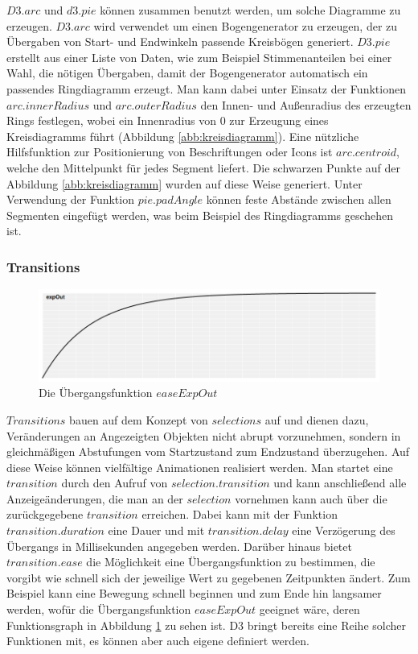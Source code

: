 $D3.arc$ und $d3.pie$ können zusammen benutzt werden, um solche Diagramme zu erzeugen. $D3.arc$ wird verwendet um einen Bogengenerator zu erzeugen, der zu Übergaben von Start- und Endwinkeln passende Kreisbögen generiert. $D3.pie$ erstellt aus einer Liste von Daten, wie zum Beispiel Stimmenanteilen bei einer Wahl, die nötigen Übergaben, damit der Bogengenerator automatisch ein passendes Ringdiagramm erzeugt. Man kann dabei unter Einsatz der Funktionen $arc.innerRadius$ und $arc.outerRadius$ den Innen- und Außenradius des erzeugten Rings festlegen, wobei ein Innenradius von 0 zur Erzeugung eines Kreisdiagramms führt (Abbildung \ref{abb:kreisdiagramm}). Eine nützliche Hilfsfunktion zur Positionierung von Beschriftungen oder Icons ist $arc.centroid$, welche den Mittelpunkt für jedes Segment liefert. Die schwarzen Punkte auf der Abbildung \ref{abb:kreisdiagramm} wurden auf diese Weise generiert. Unter Verwendung der Funktion $pie.padAngle$ können feste Abstände zwischen allen Segmenten eingefügt werden, was beim Beispiel des Ringdiagramms geschehen ist. 

\subsubsection*{Transitions}\label{sec:transitions}
\begin{figure}
	\centering
	\includegraphics[width=\linewidth]{../screenshots/expOut.png}
	\caption{Die Übergangsfunktion $easeExpOut$}
	\label{abb:easing}
\end{figure}
$Transitions$ bauen auf dem Konzept von $selections$ auf und dienen dazu, Veränderungen an Angezeigten Objekten nicht abrupt vorzunehmen, sondern in gleichmäßigen Abstufungen vom Startzustand zum Endzustand überzugehen. Auf diese Weise können vielfältige Animationen realisiert werden. Man startet eine $transition$ durch den Aufruf von $selection.transition$ und kann anschließend alle Anzeigeänderungen, die man an der $selection$ vornehmen kann auch über die zurückgegebene $transition$ erreichen. Dabei kann mit der Funktion $transition.duration$ eine Dauer und mit $transition.delay$ eine Verzögerung des Übergangs in Millisekunden angegeben werden. Darüber hinaus bietet $transition.ease$ die Möglichkeit eine Übergangsfunktion zu bestimmen, die vorgibt wie schnell sich der jeweilige Wert zu gegebenen Zeitpunkten ändert. Zum Beispiel kann eine Bewegung schnell beginnen und zum Ende hin langsamer werden, wofür die Übergangsfunktion $easeExpOut$ geeignet wäre, deren Funktionsgraph in Abbildung \ref{abb:easing}  zu sehen ist. D3 bringt bereits eine Reihe solcher Funktionen mit, es können aber auch eigene definiert werden.

